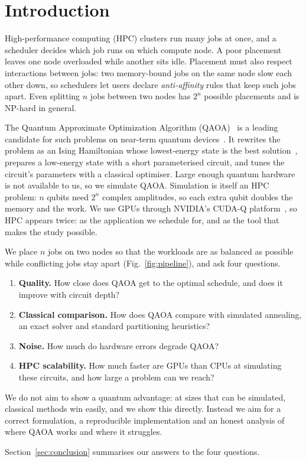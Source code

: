 
\section{Introduction}
\label{sec:intro}

High-performance computing (HPC) clusters run many jobs at once, and a scheduler decides which job runs on which compute node.
A poor placement leaves one node overloaded while another sits idle.
Placement must also respect interactions between jobs: two memory-bound jobs on the same node slow each other down, so schedulers let users declare \emph{anti-affinity} rules that keep such jobs apart.
Even splitting $n$ jobs between two nodes has $2^n$ possible placements and is NP-hard in general.

The Quantum Approximate Optimization Algorithm (QAOA)~\cite{farhi2014} is a leading candidate for such problems on near-term quantum devices~\cite{preskill2018}.
It rewrites the problem as an Ising Hamiltonian whose lowest-energy state is the best solution~\cite{lucas2014}, prepares a low-energy state with a short parameterised circuit, and tunes the circuit's parameters with a classical optimiser.
Large enough quantum hardware is not available to us, so we simulate QAOA.
Simulation is itself an HPC problem: $n$ qubits need $2^n$ complex amplitudes, so each extra qubit doubles the memory and the work.
We use GPUs through NVIDIA's CUDA-Q platform~\cite{cudaq}, so HPC appears twice: as the application we schedule for, and as the tool that makes the study possible.

We place $n$ jobs on two nodes so that the workloads are as balanced as possible while conflicting jobs stay apart (Fig.~\ref{fig:pipeline}), and ask four questions.

\begin{enumerate}
  \item[\textbf{RQ1}] \textbf{Quality.} How close does QAOA get to the optimal schedule, and does it improve with circuit depth?
  \item[\textbf{RQ2}] \textbf{Classical comparison.} How does QAOA compare with simulated annealing, an exact solver and standard partitioning heuristics?
  \item[\textbf{RQ3}] \textbf{Noise.} How much do hardware errors degrade QAOA?
  \item[\textbf{RQ4}] \textbf{HPC scalability.} How much faster are GPUs than CPUs at simulating these circuits, and how large a problem can we reach?
\end{enumerate}

We do not aim to show a quantum advantage: at sizes that can be simulated, classical methods win easily, and we show this directly.
Instead we aim for a correct formulation, a reproducible implementation and an honest analysis of where QAOA works and where it struggles.

Section~\ref{sec:conclusion} summarises our answers to the four questions.
